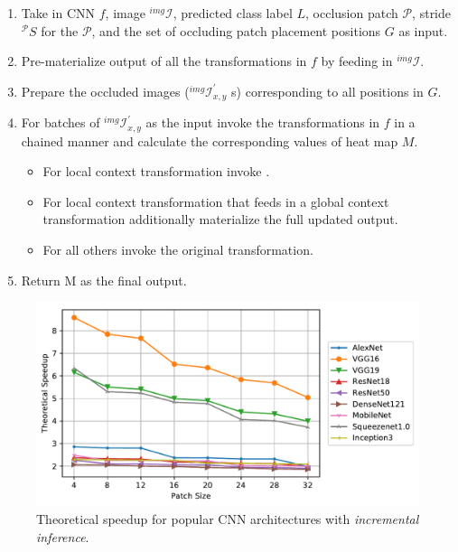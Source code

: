\begin{enumerate}
	\item Take in CNN $f$, image ${}^{img}\mathcal{I}$, predicted class label $L$, occlusion patch $\mathcal{P}$, stride ${}^{\mathcal{P}}S$ for the $\mathcal{P}$, and the set of occluding patch placement positions $G$ as input.
	\item Pre-materialize output of all the transformations in $f$ by feeding in ${}^{img}\mathcal{I}$.
	\item Prepare the occluded images (${}^{img}\mathcal{I}^{'}_{x,y}$ s) corresponding to all positions in $G$.
	\item For batches of ${}^{img}\mathcal{I}^{'}_{x,y}$ as the input invoke the transformations in $f$ in a chained manner and calculate the corresponding values of heat map $M$.
	\begin{itemize}
		\item For local context transformation invoke .
		\item For local context transformation that feeds in a global context transformation additionally materialize the full updated output.
		\item For all others invoke the original transformation.
	\end{itemize}
	\item Return M as the final output.
\end{enumerate}


\begin{figure}[t]
\includegraphics[width=\columnwidth]{images/redundancy_ratio}
\caption{Theoretical speedup for popular CNN architectures with \textit{incremental inference}.}
\label{fig:redundancy_ratio}
\end{figure}

